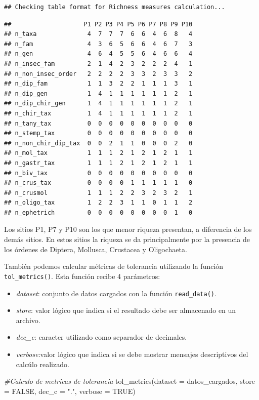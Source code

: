 \documentclass[
]{book}
\newenvironment{Shaded}{\begin{snugshade}}{\end{snugshade}}
\newcommand{\AttributeTok}[1]{\textcolor[rgb]{0.77,0.63,0.00}{#1}}
\newcommand{\CommentTok}[1]{\textcolor[rgb]{0.56,0.35,0.01}{\textit{#1}}}
\newcommand{\ConstantTok}[1]{\textcolor[rgb]{0.00,0.00,0.00}{#1}}
\newcommand{\FunctionTok}[1]{\textcolor[rgb]{0.00,0.00,0.00}{#1}}
\newcommand{\NormalTok}[1]{#1}
\newcommand{\StringTok}[1]{\textcolor[rgb]{0.31,0.60,0.02}{#1}}
\providecommand{\tightlist}{%
  \setlength{\itemsep}{0pt}\setlength{\parskip}{0pt}}
\begin{document}
\begin{verbatim}
## Checking table format for Richness measures calculation...
\end{verbatim}

\begin{verbatim}
##                    P1 P2 P3 P4 P5 P6 P7 P8 P9 P10
## n_taxa              4  7  7  7  6  6  4  6  8   4
## n_fam               4  3  6  5  6  6  4  6  7   3
## n_gen               4  6  4  5  5  6  4  6  6   4
## n_insec_fam         2  1  4  2  3  2  2  2  4   1
## n_non_insec_order   2  2  2  2  3  3  2  3  3   2
## n_dip_fam           1  1  3  2  2  1  1  1  3   1
## n_dip_gen           1  4  1  1  1  1  1  1  2   1
## n_dip_chir_gen      1  4  1  1  1  1  1  1  2   1
## n_chir_tax          1  4  1  1  1  1  1  1  2   1
## n_tany_tax          0  0  0  0  0  0  0  0  0   0
## n_stemp_tax         0  0  0  0  0  0  0  0  0   0
## n_non_chir_dip_tax  0  0  2  1  1  0  0  0  2   0
## n_mol_tax           1  1  1  2  1  2  1  2  1   1
## n_gastr_tax         1  1  1  2  1  2  1  2  1   1
## n_biv_tax           0  0  0  0  0  0  0  0  0   0
## n_crus_tax          0  0  0  0  1  1  1  1  1   0
## n_crusmol           1  1  1  2  2  3  2  3  2   1
## n_oligo_tax         1  2  2  3  1  1  0  1  1   2
## n_ephetrich         0  0  0  0  0  0  0  0  1   0
\end{verbatim}

Los sitios P1, P7 y P10 son los que menor riqueza presentan, a diferencia de los demás sitios.
En estos sitios la riqueza se da principalmente por la presencia de los órdenes de Diptera, Mollusca, Crustacea y Oligochaeta.

También podemos calcular métricas de tolerancia utilizando la función \texttt{tol\_metrics()}.
Esta función recibe 4 parámetros:

\begin{itemize}
\tightlist
\item
  \emph{dataset}: conjunto de datos cargados con la función \texttt{read\_data()}.
\item
  \emph{store}: valor lógico que indica si el resultado debe ser almacenado en un archivo.
\item
  \emph{dec\_c}: caracter utilizado como separador de decimales.
\item
  \emph{verbose}:valor lógico que indica si se debe mostrar mensajes descriptivos del calcúlo realizado.
\end{itemize}

\begin{Shaded}
\begin{Highlighting}[]
\CommentTok{\#Calculo de metricas de tolerancia}
\FunctionTok{tol\_metrics}\NormalTok{(}\AttributeTok{dataset =}\NormalTok{ datos\_cargados, }\AttributeTok{store =} \ConstantTok{FALSE}\NormalTok{, }\AttributeTok{dec\_c =} \StringTok{"."}\NormalTok{, }\AttributeTok{verbose =} \ConstantTok{TRUE}\NormalTok{)}
\end{Highlighting}
\end{Shaded}
\end{document}

